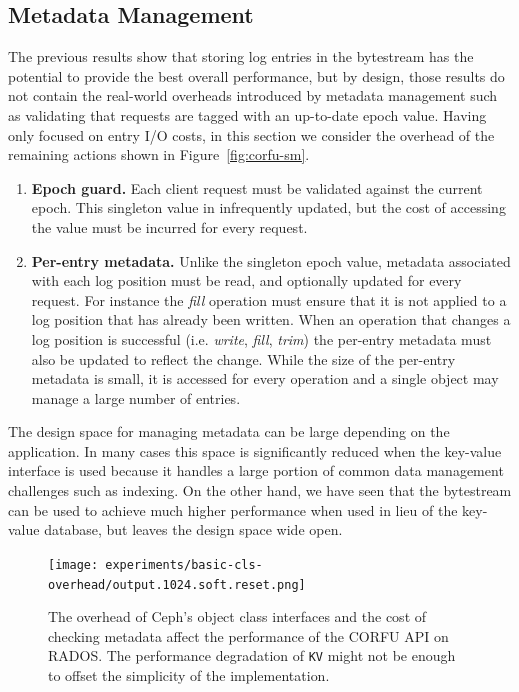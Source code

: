 \documentclass[10pt,twocolumn]{article}
\begin{document}
\subsection{Metadata Management}

The previous results show that storing log entries in the bytestream has the
potential to provide the best overall performance, but by design, those
results do not contain the real-world overheads introduced by metadata
management such as validating that requests are tagged with an up-to-date
epoch value. Having only focused on entry I/O costs, in this section we
consider the overhead of the remaining actions shown in
Figure~\ref{fig:corfu-sm}.

\begin{enumerate}
    \item {\bf Epoch guard.} Each client request must be validated against the
        current epoch. This singleton value in infrequently updated, but the
        cost of accessing the value must be incurred for every request.

    \item {\bf Per-entry metadata.} Unlike the singleton epoch value, metadata
        associated with each log position must be read, and optionally updated
        for every request. For instance the \emph{fill} operation must ensure
        that it is not applied to a log position that has already been
        written. When an operation that changes a log position is successful
        (i.e. \emph{write}, \emph{fill}, \emph{trim}) the per-entry metadata
        must also be updated to reflect the change. While the size of the
        per-entry metadata is small, it is accessed for every operation and a
        single object may manage a large number of entries.
\end{enumerate}

The design space for managing metadata can be large depending on the
application. In many cases this space is significantly reduced when the
key-value interface is used because it handles a large portion of common data
management challenges such as indexing. On the other hand, we have seen that
the bytestream can be used to achieve much higher performance when used in
lieu of the key-value database, but leaves the design space wide open.

\begin{figure}[t]
	\centering
	\texttt{[image: experiments/basic-cls-overhead/output.1024.soft.reset.png]}	
	\caption{The overhead of Ceph's object class interfaces and the cost of checking metadata affect the performance of the CORFU API on RADOS. The performance degradation of \texttt{KV} might not be enough to offset the simplicity of the implementation.}
	\label{fig:cls_wr_jewel}
\end{figure}
\end{document}
